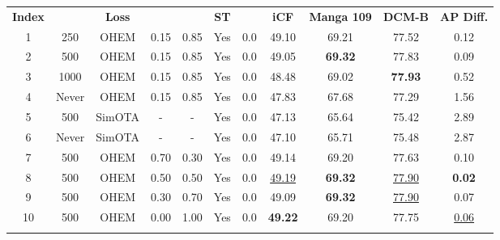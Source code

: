 \documentclass{article}
\begin{document}
\begin{table*}
\centering
\begin{tabular}{c|cccccc|ccc|c}
    \hline
    \noalign{\smallskip}
    
    \textbf{Index} & \textbf{} & \textbf{Loss} 
    & \textbf{} & \textbf{} & \textbf{ST} & \textbf{}
    & \textbf{iCF} & \textbf{Manga 109} & \textbf{DCM-B} & \textbf{AP Diff.} \\
    
    \noalign{\smallskip}
    \hline
    \noalign{\smallskip}
    
    1 & 250 & OHEM & 0.15 & 0.85 & Yes & 0.0 & 49.10  & 69.21 & 77.52 & 0.12 \\
    
    2 & 500 & OHEM & 0.15 & 0.85 & Yes & 0.0 & 49.05  & \textbf{69.32} & 77.83 &  0.09 \\
    
    3 & 1000 & OHEM & 0.15 & 0.85 & Yes & 0.0 & 48.48  &	69.02  & \textbf{77.93} & 0.52 \\
    
    4 & Never & OHEM & 0.15 & 0.85 & Yes & 0.0 & 47.83  & 67.68 & 77.29 & 1.56 \\

    \noalign{\smallskip}
    \hline
    \noalign{\smallskip}
    
    5 & 500 & SimOTA & - & - & Yes & 0.0 & 47.13  & 65.64 & 75.42 & 2.89 \\
    
    6 & Never & SimOTA & - & - & Yes & 0.0 & 47.10  & 65.71 & 75.48  &  2.87 \\
    
    \noalign{\smallskip}
    \hline
    \noalign{\smallskip}
    
    7 & 500 & OHEM & 0.70 & 0.30 & Yes & 0.0 & 49.14 & 69.20 & 77.63 & 0.10 \\
    
    8 & 500 & OHEM & 0.50 & 0.50 & Yes & 0.0 & \underline{49.19} & \textbf{69.32} & \underline{77.90} & \textbf{0.02} \\
     
    9 & 500 & OHEM & 0.30 & 0.70 & Yes & 0.0 & 49.09 & \textbf{69.32} & \underline{77.90} & 0.07 \\
    
    10 & 500 & OHEM & 0.00 & 1.00 & Yes & 0.0 & \textbf{49.22} & 69.20 & 77.75 & \underline{0.06} \\

    \noalign{\smallskip}
    \hline
    \noalign{\smallskip}


\end{tabular}
\end{table*}
\end{document}
